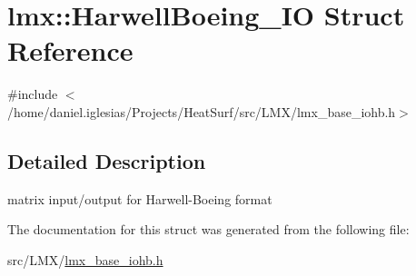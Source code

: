 \hypertarget{structlmx_1_1HarwellBoeing__IO}{\section{lmx\-:\-:Harwell\-Boeing\-\_\-\-I\-O Struct Reference}
\label{structlmx_1_1HarwellBoeing__IO}
}


{\ttfamily \#include $<$/home/daniel.\-iglesias/\-Projects/\-Heat\-Surf/src/\-L\-M\-X/lmx\-\_\-base\-\_\-iohb.\-h$>$}



\subsection{Detailed Description}
matrix input/output for Harwell-\/\-Boeing format 

The documentation for this struct was generated from the following file\-:\begin{DoxyCompactItemize}
\item 
src/\-L\-M\-X/\hyperlink{lmx__base__iohb_8h}{lmx\-\_\-base\-\_\-iohb.\-h}\end{DoxyCompactItemize}

